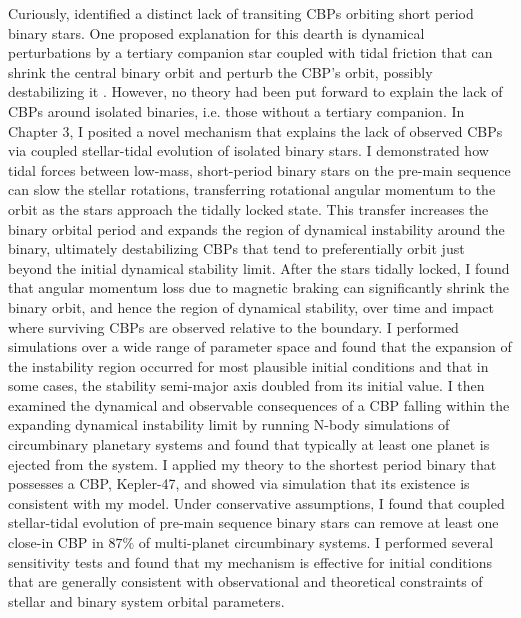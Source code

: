 Curiously, \kepler identified a distinct lack of transiting CBPs orbiting short period binary stars. One proposed explanation for this dearth is dynamical perturbations by a tertiary companion star coupled with tidal friction that can shrink the central binary orbit and perturb the CBP's orbit, possibly destabilizing it \citep{Munoz2015,Martin2015b,Hamers2016}.  However, no theory had been put forward to explain the lack of CBPs around isolated binaries, i.e. those without a tertiary companion. In Chapter 3, I posited a novel mechanism that explains the lack of observed CBPs via coupled stellar-tidal evolution of isolated binary stars. I demonstrated how tidal forces between low-mass, short-period binary stars on the pre-main sequence can slow the stellar rotations, transferring rotational angular momentum to the orbit as the stars approach the tidally locked state.  This transfer increases the binary orbital period and expands the region of dynamical instability around the binary, ultimately destabilizing CBPs that tend to preferentially orbit just beyond the initial dynamical stability limit.  After the stars tidally locked, I found that angular momentum loss due to magnetic braking can significantly shrink the binary orbit, and hence the region of dynamical stability, over time and impact where surviving CBPs are observed relative to the boundary.  I performed simulations over a wide range of parameter space and found that the expansion of the instability region occurred for most plausible initial conditions and that in some cases, the stability semi-major axis doubled from its initial value.  I then examined the dynamical and observable consequences of a CBP falling within the expanding dynamical instability limit by running N-body simulations of circumbinary planetary systems and found that typically at least one planet is ejected from the system.  I applied my theory to the shortest period \kepler binary that possesses a CBP, Kepler-47, and showed via simulation that its existence is consistent with my model.  Under conservative assumptions, I found that coupled stellar-tidal evolution of pre-main sequence binary stars can remove at least one close-in CBP in $87\%$ of multi-planet circumbinary systems. I performed several sensitivity tests and found that my mechanism is effective for initial conditions that are generally consistent with observational and theoretical constraints of stellar and binary system orbital parameters. 

